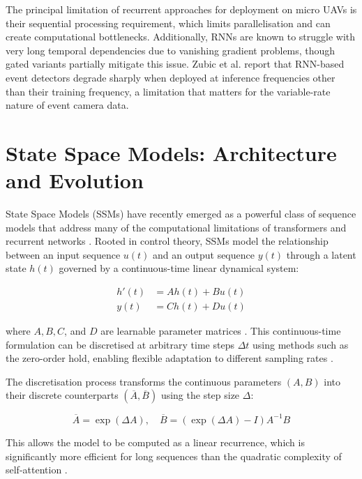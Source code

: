 \documentclass[11pt, a4paper]{report}
\begin{document}
The principal limitation of recurrent approaches for deployment on micro UAVs is their sequential processing requirement, which limits parallelisation and can create computational bottlenecks. Additionally, RNNs are known to struggle with very long temporal dependencies due to vanishing gradient problems, though gated variants partially mitigate this issue. Zubic et al. \cite{zubic2024state} report that RNN-based event detectors degrade sharply when deployed at inference frequencies other than their training frequency, a limitation that matters for the variable-rate nature of event camera data. 

\section{State Space Models: Architecture and Evolution}
State Space Models (SSMs) have recently emerged as a powerful class of sequence models that address many of the computational limitations of transformers and recurrent networks \cite{gu2022efficiently}. Rooted in control theory, SSMs model the relationship between an input sequence $u(t)$ and an output sequence $y(t)$ through a latent state $h(t)$ governed by a continuous-time linear dynamical system:

\begin{align}
    h'(t) &= Ah(t) + Bu(t) \\
    y(t) &= Ch(t) + Du(t)
\end{align}

where $A, B, C$, and $D$ are learnable parameter matrices \cite{gu2022efficiently}. This continuous-time formulation can be discretised at arbitrary time steps $\Delta t$ using methods such as the zero-order hold, enabling flexible adaptation to different sampling rates \cite{gu2022efficiently, zubic2024state}. 

The discretisation process transforms the continuous parameters $(A, B)$ into their discrete counterparts $(\overline{A}, \overline{B})$ using the step size $\Delta$:

\begin{equation}
    \overline{A} = \exp(\Delta A), \quad \overline{B} = (\exp(\Delta A) - I)A^{-1}B
\end{equation}

This allows the model to be computed as a linear recurrence, which is significantly more efficient for long sequences than the quadratic complexity of self-attention \cite{gu2023mamba, somvanshi2025from}.
\end{document}
